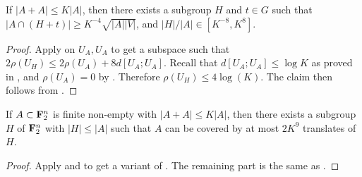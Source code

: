 \begin{corollary}\label{pfr-9-aux}\leanok
If $|A+A| \leq K|A|$, then there exists a subgroup $H$ and $t\in G$ such that $|A \cap (H+t)| \geq K^{-4} \sqrt{|A||V|}$, and $|H|/|A|\in[K^{-8},K^8]$.
\end{corollary}

\begin{proof}
  Apply  on $U_A,U_A$ to get a subspace such that $2\rho(U_H)\le 2\rho(U_A)+8d[U_A;U_A]$. Recall that $d[U_A;U_A]\le \log K$ as proved in , and $\rho(U_A)=0$ by . Therefore $\rho(U_H)\le 4\log(K)$. The claim then follows from .
\end{proof}

\begin{theorem}[PFR with \texorpdfstring{$C=9$}{C=9}]\label{pfr-9}\leanok  If $A \subset {\bf F}_2^n$ is finite non-empty with $|A+A| \leq K|A|$, then there exists a subgroup $H$ of ${\bf F}_2^n$ with $|H| \leq |A|$ such that $A$ can be covered by at most $2K^9$ translates of $H$.
\end{theorem}

\begin{proof}
Apply  and  to get a variant of . The remaining part is the same as .
\end{proof}
